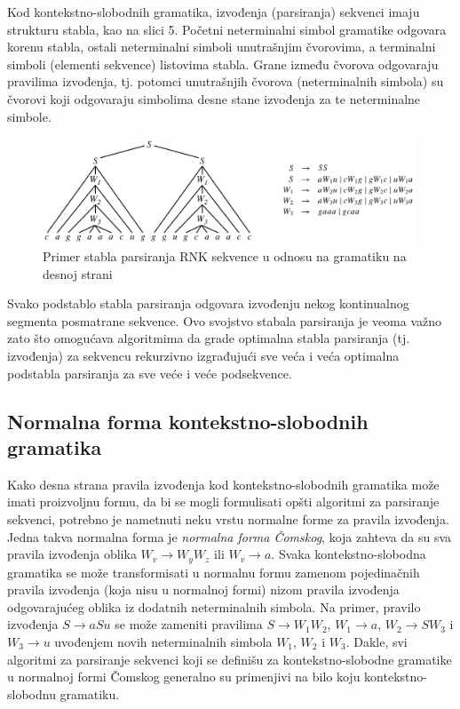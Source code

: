 \documentclass[a4paper, 12pt]{article}
\begin{document}
Kod kontekstno-slobodnih gramatika, izvođenja (parsiranja) sekvenci imaju strukturu stabla, kao na slici 5. Početni neterminalni simbol gramatike odgovara korenu stabla, ostali neterminalni simboli unutrašnjim čvorovima, a terminalni simboli (elementi sekvence) listovima stabla. Grane između čvorova odgovaraju pravilima izvođenja, tj. potomci unutrašnjih čvorova (neterminalnih simbola) su čvorovi koji odgovaraju simbolima desne stane izvođenja za te neterminalne simbole.

\begin{figure}[h!]
  \centering
  \vspace{0.05cm}
  \includegraphics[width=0.99\textwidth]{parsiranje}
  \caption{Primer stabla parsiranja RNK sekvence u odnosu na gramatiku na desnoj strani}
\end{figure}

Svako podstablo stabla parsiranja odgovara izvođenju nekog kontinualnog segmenta posmatrane sekvence. Ovo svojstvo stabala parsiranja je veoma važno zato što omogućava algoritmima da grade optimalna stabla parsiranja (tj. izvođenja) za sekvencu rekurzivno izgrađujući sve veća i veća optimalna podstabla parsiranja za sve veće i veće podsekvence.

\subsection{Normalna forma kontekstno-slobodnih gramatika}

Kako desna strana pravila izvođenja kod kontekstno-slobodnih gramatika može imati proizvoljnu formu, da bi se mogli formulisati opšti algoritmi za parsiranje sekvenci, potrebno je nametnuti neku vrstu normalne forme za pravila izvođenja. Jedna takva normalna forma je \textit{normalna forma Čomskog}, koja zahteva da su sva pravila izvođenja oblika $W_v \rightarrow W_yW_z$ ili $W_v \rightarrow a$. Svaka kontekstno-slobodna gramatika se može transformisati u normalnu formu zamenom pojedinačnih pravila izvođenja (koja nisu u normalnoj formi) nizom pravila izvođenja odgovarajućeg oblika iz dodatnih neterminalnih simbola. Na primer, pravilo izvođenja $S \rightarrow aSu$ se može zameniti pravilima $S \rightarrow W_1W_2$, $W_1 \rightarrow a$, $W_2 \rightarrow SW_3$ i $W_3 \rightarrow u$ uvođenjem novih neterminalnih simbola $W_1$, $W_2$ i $W_3$. Dakle, svi algoritmi za parsiranje sekvenci koji se definišu za kontekstno-slobodne gramatike u normalnoj formi Čomskog generalno su primenjivi na bilo koju kontekstno-slobodnu gramatiku.
\end{document}
